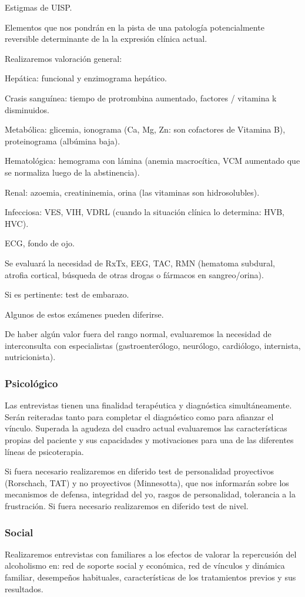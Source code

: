Estigmas de UISP.

Elementos que nos pondrán en la pista de una patología potencialmente reversible determinante de la la expresión clínica actual.

Realizaremos valoración general:

Hepática: funcional y enzimograma hepático.

Crasis sanguínea: tiempo de protrombina aumentado, factores / vitamina k disminuidos.

Metabólica: glicemia, ionograma (Ca, Mg, Zn: son cofactores de Vitamina B), proteinograma (albúmina baja).

Hematológica: hemograma con lámina (anemia macrocítica, VCM aumentado que se normaliza luego de la abstinencia).

Renal: azoemia, creatininemia, orina (las vitaminas son hidrosolubles).

Infecciosa: VES, VIH, VDRL (cuando la situación clínica lo determina: HVB, HVC).

ECG, fondo de ojo.

Se evaluará la necesidad de RxTx, EEG, TAC, RMN (hematoma subdural, atrofia cortical, búsqueda de otras drogas o fármacos en sangreo/orina).

Si es pertinente: test de embarazo.

Algunos de estos exámenes pueden diferirse.

De haber algún valor fuera del rango normal, evaluaremos la necesidad de interconsulta con especialistas (gastroenterólogo, neurólogo, cardiólogo, internista, nutricionista).

\subsubsection*{Psicológico}
Las entrevistas tienen una finalidad terapéutica y diagnóstica simultáneamente. Serán reiteradas tanto para completar el diagnóstico como para afianzar el vínculo. Superada la agudeza del cuadro actual evaluaremos las características propias del paciente y sus capacidades y motivaciones para una de las diferentes líneas de psicoterapia.

Si fuera necesario realizaremos en diferido test de personalidad proyectivos (Rorschach, TAT) y no proyectivos (Minnesotta), que nos informarán sobre los mecanismos de defensa, integridad del yo, rasgos de personalidad, tolerancia a la frustración. Si fuera necesario realizaremos en diferido test de nivel.
\subsubsection*{Social}
Realizaremos entrevistas con familiares a los efectos de valorar la repercusión del alcoholismo en: red de soporte social y económica, red de vínculos y dinámica familiar, desempeños habituales, características de los tratamientos previos y sus resultados.
